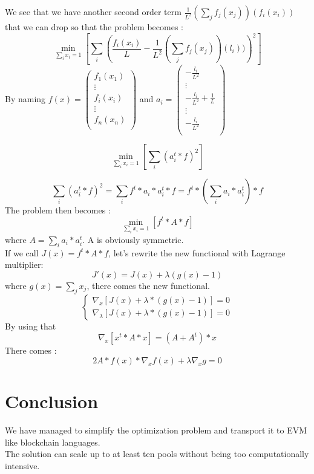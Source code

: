 \documentclass[conference]{IEEEtran}
\begin{document}
We see that we have another second order term $\frac{1}{L^2}(\sum_j f_j(x_j))(f_i(x_i))$ that we can drop so that the problem becomes :
\begin{equation}\label{ref:simplifiedProblem}
    \min_{\sum_{i} x_i = 1} \left[ \sum_{i}\left(\frac{f_i(x_i)}{L} - \frac{1}{L^2}(\sum_j f_j(x_j))(l_i)) \right)^2\right]
\end{equation}
By naming
$
f(x)
=
\begin{pmatrix} 
	f_1(x_1) \\
	\vdots\\
	f_i(x_i) \\
	\vdots\\
	f_n(x_n) \\
	\end{pmatrix} 
$
and 
$
a_i
=
\begin{pmatrix} 
	-\frac{l_i}{L^2} \\
	\vdots\\
	-\frac{l_i}{L^2} + \frac{1}{L}\\
	\vdots\\
	-\frac{l_i}{L^2} \\
	\end{pmatrix} 
$

\begin{equation}\label{ref:simplifiedProblem}
    \min_{\sum_{i} x_i = 1} \left[ \sum_{i}\left( a_i^t * f \right)^2\right]
\end{equation}

$$
\sum_{i}\left( a_i^t * f \right)^2 =\sum_{i}  f^t *a_i*a_i^t * f  =f^t *(\sum_{i} a_i*a_i^t)* f 
$$
The problem then becomes :
\begin{equation}\label{ref:simplifiedProblem}
    \min_{\sum_{i} x_i = 1} \left[ f^t*A*f\right]
\end{equation}
where $A=\sum_{i} a_i*a_i^t$. A is obviously symmetric.\\
If we call $J(x)=f^t*A*f$, let's rewrite the new functional with Lagrange multiplier:
\begin{equation}
J'(x) = J(x) + \lambda (g(x)-1)
\end{equation}
where $g(x) = \sum_j x_j$, there comes the new functional.
\begin{equation}
\left\{
\begin{array}{ll}
  \nabla_x \left[ J(x) + \lambda * (g(x) - 1) \right] = 0\\
  \nabla_\lambda \left[ J(x) + \lambda * (g(x) - 1) \right] = 0
\end{array}
\right.
\end{equation}
By using that 
\begin{equation}
\nabla_x \left[x^t*A*x\right] = (A + A^t)*x    
\end{equation}
There comes :
\begin{equation}
    2A*f(x)*\nabla_x f(x) + \lambda \nabla_x g = 0 
\end{equation}


\section{Conclusion}
We have managed to simplify the optimization problem and transport it to EVM like blockchain languages.\\
The solution can scale up to at least ten pools without being too computationally intensive.\\


\nocite{*}
\end{document}

